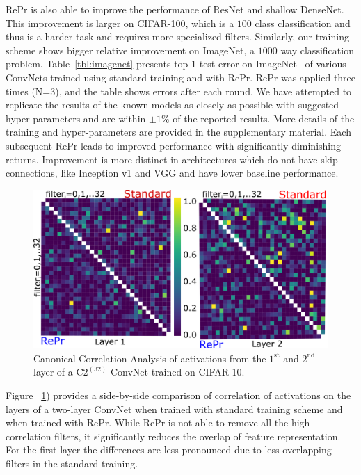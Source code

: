 RePr is also able to improve the performance of ResNet and shallow DenseNet.
This improvement is larger on CIFAR-100, which is a $100$ class classification and thus is a harder task and requires more specialized filters.
Similarly, our training scheme shows bigger relative improvement on ImageNet, a $1000$ way classification problem.
Table~\ref{tbl:imagenet} presents top-1 test error on ImageNet~\cite{Russakovsky2015ImageNetLS} of various ConvNets trained using standard training and with RePr.
RePr was applied three times (N=3), and the table shows errors after each round.
We have attempted to replicate the results of the known models as closely as possible with suggested hyper-parameters and are within $\pm 1\%$ of the reported results.
More details of the training and hyper-parameters are provided in the supplementary material.
Each subsequent RePr leads to improved performance with significantly diminishing returns.
Improvement is more distinct in architectures which do not have skip connections, like Inception v1 and VGG and have lower baseline performance.

\begin{figure}[H]
   \includegraphics[width=0.999\linewidth]{figures/repr/filter_CCA_3_second_rebuttal.pdf}
   \caption[Comparison of Filter Overlap]{Canonical Correlation Analysis of activations from the $1^\text{st}$ and $2^\text{nd}$ layer of a C$2^(32)$ ConvNet trained on CIFAR-10.}
   \label{fig:CCA_after}
\end{figure}

Figure ~\ref{fig:CCA_after}) provides a side-by-side comparison of correlation of activations on the layers of a two-layer ConvNet when trained with standard training scheme and when trained with RePr. While RePr is not able to remove all the high correlation filters, it significantly reduces the overlap of feature representation. For the first layer the differences are less pronounced due to less overlapping filters in the standard training.



